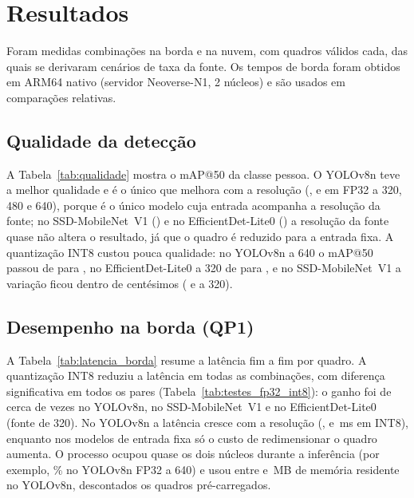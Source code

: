 \section{Resultados}
\label{sec:resultados}

Foram medidas \nCombBorda{} combinações na borda e \nCombNuvem{} na nuvem, com \nQuadrosValidos{}
quadros válidos cada, das quais se derivaram \nCenarios{} cenários de taxa da fonte. Os tempos de borda
foram obtidos em ARM64 nativo (servidor Neoverse-N1, 2 núcleos) e são usados em comparações relativas.

\subsection{Qualidade da detecção}
A Tabela~\ref{tab:qualidade} mostra o mAP@50 da classe pessoa. O YOLOv8n teve a melhor qualidade e é o
único que melhora com a resolução (\mapYoloFpTres{}, \mapYoloFpQuatro{} e \mapYoloFpSeis{} em FP32 a 320,
480 e 640), porque é o único modelo cuja entrada acompanha a resolução da fonte; no SSD-MobileNet~V1
(\mapSsdFpTres{}) e no EfficientDet-Lite0 (\mapEffdetFpTres{}) a resolução da fonte quase não altera o
resultado, já que o quadro é reduzido para a entrada fixa. A quantização INT8 custou pouca qualidade: no
YOLOv8n a 640 o mAP@50 passou de \mapYoloFpSeis{} para \mapYoloIntSeis{}, no EfficientDet-Lite0 a 320 de
\mapEffdetFpTres{} para \mapEffdetIntTres{}, e no SSD-MobileNet~V1 a variação ficou dentro de
centésimos (\mapSsdFpTres{} e \mapSsdIntTres{} a 320).



\subsection{Desempenho na borda (QP1)}
A Tabela~\ref{tab:latencia_borda} resume a latência fim a fim por quadro. A quantização INT8 reduziu a
latência em todas as combinações, com diferença significativa em todos os pares
(Tabela~\ref{tab:testes_fp32_int8}): o ganho foi de cerca de \razaoYoloTres{} vezes no YOLOv8n,
\razaoSsdTres{} no SSD-MobileNet~V1 e \razaoEffdetTres{} no EfficientDet-Lite0 (fonte de 320). No YOLOv8n a
latência cresce com a resolução (\etoeYoloIntTres{}, \etoeYoloIntQuatro{} e \etoeYoloIntSeis{}\,ms em INT8),
enquanto nos modelos de entrada fixa só o custo de redimensionar o quadro aumenta. O processo ocupou
quase os dois núcleos durante a inferência (por exemplo, \cpuYoloFpSeis\% no YOLOv8n FP32 a 640) e usou
entre \rssYoloIntTres{} e \rssYoloFpSeis{}\,MB de memória residente no YOLOv8n, descontados os quadros
pré-carregados.

